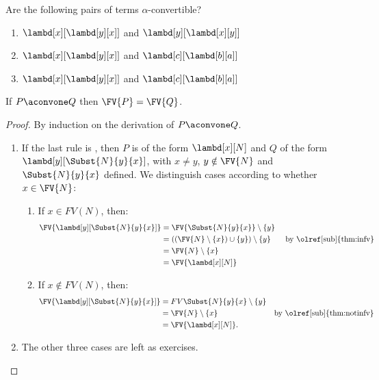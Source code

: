 \documentclass[../../../include/open-logic-section]{subfiles}
\begin{document}
\begin{prob}
  Are the following pairs of terms $\alpha$-convertible?
  \begin{enumerate}
  \item $\lambd[x][\lambd[y][x]]$ and $\lambd[y][\lambd[x][y]]$
  \item $\lambd[x][\lambd[y][x]]$ and $\lambd[c][\lambd[b][a]]$
  \item $\lambd[x][\lambd[y][x]]$ and $\lambd[c][\lambd[b][a]]$
  \end{enumerate}
\end{prob}

\begin{lem}
  If $P \aconvone Q$ then $\FV{P} = \FV{Q}$.
\end{lem}

\begin{proof}
  By induction on the derivation of $P \aconvone Q$.
  \begin{enumerate}
  \item If the last rule is , then $P$ is of the
    form $\lambd[x][N]$ and $Q$ of the form
    $\lambd[y][\Subst{N}{y}{x}]$, with $x \neq y$, $y \notin \FV{N}$
    and $\Subst{N}{y}{x}$ defined. We distinguish cases according to
    whether $x \in \FV{N}$:
    \begin{enumerate}
    \item If $x \in FV(N)$, then:
      \begin{align*}
        \FV{\lambd[y][\Subst{N}{y}{x}]} &=
        \FV{\Subst{N}{y}{x}} \setminus \{y\} \\
        & = ((\FV{N} \setminus \{x\}) \cup \{y\}) \setminus \{y\}
         && \text{ by \olref[sub]{thm:infv}} \\
        & = \FV{N} \setminus \{x\} \\
        & = \FV{\lambd[x][N]}
      \end{align*}
    \item If $x \notin FV(N)$, then:
      \begin{align*}
        \FV{\lambd[y][\Subst{N}{y}{x}]}
        & = FV{\Subst{N}{y}{x}} \setminus \{y\} \\
        & = \FV{N} \setminus \{x\}
         && \text{by \olref[sub]{thm:notinfv}} \\
        & = \FV{\lambd[x][N]}.
      \end{align*}
    \end{enumerate}
  \item The other three cases are left as exercises. 
  \end{enumerate}
\end{proof}
\end{document}
